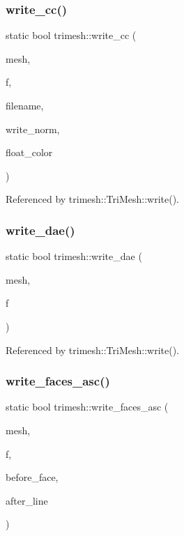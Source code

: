 \subsubsection{\texorpdfstring{write\+\_\+cc()}{write\_cc()}}
{\footnotesize\ttfamily static bool trimesh\+::write\+\_\+cc (\begin{DoxyParamCaption}\item[{\hyperlink{classtrimesh_1_1TriMesh}{Tri\+Mesh} $\ast$}]{mesh,  }\item[{F\+I\+LE $\ast$}]{f,  }\item[{const char $\ast$}]{filename,  }\item[{bool}]{write\+\_\+norm,  }\item[{bool}]{float\+\_\+color }\end{DoxyParamCaption})\hspace{0.3cm}{\ttfamily [static]}}



Referenced by trimesh\+::\+Tri\+Mesh\+::write().

\mbox{\label{namespacetrimesh_a04f0ec0ebcad013e537bcd150a3b0d0f}} 
\subsubsection{\texorpdfstring{write\+\_\+dae()}{write\_dae()}}
{\footnotesize\ttfamily static bool trimesh\+::write\+\_\+dae (\begin{DoxyParamCaption}\item[{\hyperlink{classtrimesh_1_1TriMesh}{Tri\+Mesh} $\ast$}]{mesh,  }\item[{F\+I\+LE $\ast$}]{f }\end{DoxyParamCaption})\hspace{0.3cm}{\ttfamily [static]}}



Referenced by trimesh\+::\+Tri\+Mesh\+::write().

\mbox{\label{namespacetrimesh_af34167be8d3e30e738788609dfbf54b5}} 
\subsubsection{\texorpdfstring{write\+\_\+faces\+\_\+asc()}{write\_faces\_asc()}}
{\footnotesize\ttfamily static bool trimesh\+::write\+\_\+faces\+\_\+asc (\begin{DoxyParamCaption}\item[{\hyperlink{classtrimesh_1_1TriMesh}{Tri\+Mesh} $\ast$}]{mesh,  }\item[{F\+I\+LE $\ast$}]{f,  }\item[{const char $\ast$}]{before\+\_\+face,  }\item[{const char $\ast$}]{after\+\_\+line }\end{DoxyParamCaption})\hspace{0.3cm}{\ttfamily [static]}}



